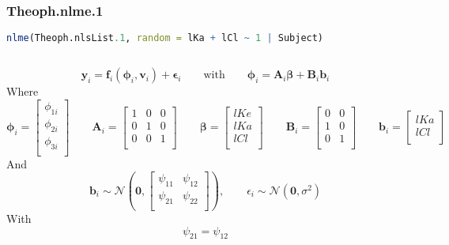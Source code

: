 \documentclass[a4paper,12pt]{article}
\begin{document}
	\subsubsection*{Theoph.nlme.1}
	\begin{lstlisting}[language=R]
nlme(Theoph.nlsList.1, random = lKa + lCl ~ 1 | Subject)
	\end{lstlisting}
	
	\subsection{}
	\begin{equation*}
		\boldsymbol{y}_i = \boldsymbol{f}_i\left(\boldsymbol{\phi}_i,\boldsymbol{v}_i\right) + \boldsymbol{\epsilon}_i \qquad \text{with} \qquad \boldsymbol{\phi}_i = \boldsymbol{A}_i \boldsymbol{\beta} + \boldsymbol{B}_i \boldsymbol{b}_i
	\end{equation*}
	Where
	\begin{equation*}
		\boldsymbol{\phi}_i = \begin{bmatrix}
		\phi_{1i} \\
		\phi_{2i} \\
		\phi_{3i} \\
		\end{bmatrix}
		\qquad
		\boldsymbol{A}_i = \begin{bmatrix}
		1 & 0 & 0 \\
		0 & 1 & 0 \\
		0 & 0 & 1 \\
		\end{bmatrix}
		\qquad
		\boldsymbol{\beta} = \begin{bmatrix}
		lKe \\
		lKa \\
		lCl \\
		\end{bmatrix}
		\qquad
		\boldsymbol{B}_i = \begin{bmatrix}
		0 & 0 \\
		1 & 0 \\
		0 & 1 \\
		\end{bmatrix}
		\qquad
		\boldsymbol{b}_i = \begin{bmatrix}
		lKa \\
		lCl \\
		\end{bmatrix}
	\end{equation*}
	And
	\begin{equation*}
		\boldsymbol{b}_i \sim \mathcal{N}\left(\boldsymbol{0}, \begin{bmatrix}
		\psi_{11} & \psi_{12} \\
		\psi_{21} & \psi_{22} \\
		\end{bmatrix}\right),
		\qquad
		\epsilon_{i} \sim \mathcal{N}\left(\boldsymbol{0}, \sigma^2\right)
	\end{equation*}
	With
	\begin{equation*}
		\psi_{21} = \psi_{12}
	\end{equation*}
	
\end{document}
